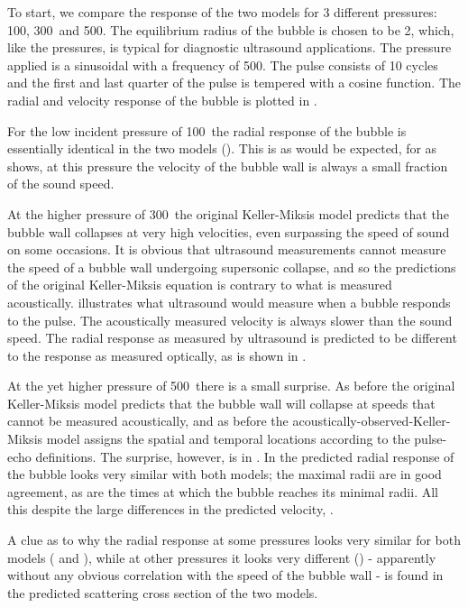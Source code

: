 To start, we compare  the response of the two models for 3 different pressures:
\unit{100}\kilo\pascal, \unit{300}\kilo\pascal\ and \unit{500}\kilo\pascal.
The equilibrium radius of the bubble is chosen to be \unit{2}\micro\meter, 
which, like the pressures, is typical for diagnostic ultrasound applications.
The pressure applied is a sinusoidal  with a frequency of \unit{500}\kilo\hertz.
The pulse consists of 10 cycles and the first and last quarter of the pulse is tempered with a cosine function.
The radial and velocity response of the bubble is plotted in .




For the low incident pressure of \unit{100}\kilo\pascal\ the radial response of the bubble is essentially identical in the two models ().
This is as would be expected, for as  shows,  at this pressure the velocity of the bubble wall 
is always a small fraction of the sound speed.

At the higher pressure of \unit{300}\kilo\pascal\ 
the original Keller-Miksis model predicts that the bubble wall collapses at very high velocities,
even surpassing the speed of sound on some occasions.
It is obvious that ultrasound measurements cannot measure the speed of a bubble wall undergoing  supersonic collapse, 
and so the predictions of the original Keller-Miksis equation is contrary to what is measured acoustically.
\Figref{R3vel} illustrates what ultrasound would measure when a bubble responds to the pulse.
The acoustically measured velocity is always slower than the sound speed.
The radial response as measured by ultrasound is predicted to be different to the response as measured optically, 
as is shown in \figref{R3rad}.

At the yet higher pressure of \unit{500}\kilo\pascal\ there is a small surprise.
As before the original Keller-Miksis model predicts that the bubble wall will collapse at speeds that cannot be measured acoustically,
and as before the acoustically-observed-Keller-Miksis model assigns the  spatial and temporal locations according to the pulse-echo definitions.
The surprise, 
however, is in .
In  the predicted radial response of the bubble looks very similar with both models;
the maximal radii are in good agreement, as are the  times at which the bubble reaches its minimal radii.
All this despite the large differences in the predicted velocity, \figref{R5vel}.

A clue as to why the radial response at some pressures looks very similar for both models ( and ),
while at other pressures it looks very different (\figref{R3rad}) 
- apparently without any obvious correlation with the speed of the bubble wall -
is found in the predicted scattering cross section of the two models.

